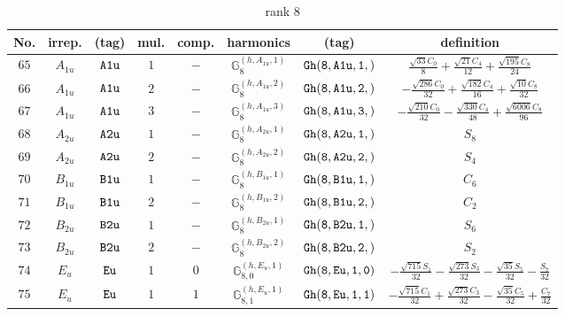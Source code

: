 \documentclass[fleqn,8pt]{jsarticle}
\begin{document}
\begin{table}[ht!]
\begin{center}
\caption{rank 8}
\renewcommand{\arraystretch}{1.3}
\begin{tabular}{cccccccc} \hline \hline
No. & irrep. & (tag) & mul. & comp. & harmonics & (tag) & definition \\ \hline
$ 65 $ & $ A_{1u} $ & $ {\tt A1u} $ & $ 1 $ & $ - $ & $ \mathbb{G}_{8}^{(h,A_{1u},1)} $ & $ {\tt Gh(8,A1u,1,)} $ & $ \frac{\sqrt{33} C_{0}}{8} + \frac{\sqrt{21} C_{4}}{12} + \frac{\sqrt{195} C_{8}}{24} $ \\
$ 66 $ & $ A_{1u} $ & $ {\tt A1u} $ & $ 2 $ & $ - $ & $ \mathbb{G}_{8}^{(h,A_{1u},2)} $ & $ {\tt Gh(8,A1u,2,)} $ & $ - \frac{\sqrt{286} C_{0}}{32} + \frac{\sqrt{182} C_{4}}{16} + \frac{\sqrt{10} C_{8}}{32} $ \\
$ 67 $ & $ A_{1u} $ & $ {\tt A1u} $ & $ 3 $ & $ - $ & $ \mathbb{G}_{8}^{(h,A_{1u},3)} $ & $ {\tt Gh(8,A1u,3,)} $ & $ - \frac{\sqrt{210} C_{0}}{32} - \frac{\sqrt{330} C_{4}}{48} + \frac{\sqrt{6006} C_{8}}{96} $ \\
$ 68 $ & $ A_{2u} $ & $ {\tt A2u} $ & $ 1 $ & $ - $ & $ \mathbb{G}_{8}^{(h,A_{2u},1)} $ & $ {\tt Gh(8,A2u,1,)} $ & $ S_{8} $ \\
$ 69 $ & $ A_{2u} $ & $ {\tt A2u} $ & $ 2 $ & $ - $ & $ \mathbb{G}_{8}^{(h,A_{2u},2)} $ & $ {\tt Gh(8,A2u,2,)} $ & $ S_{4} $ \\
$ 70 $ & $ B_{1u} $ & $ {\tt B1u} $ & $ 1 $ & $ - $ & $ \mathbb{G}_{8}^{(h,B_{1u},1)} $ & $ {\tt Gh(8,B1u,1,)} $ & $ C_{6} $ \\
$ 71 $ & $ B_{1u} $ & $ {\tt B1u} $ & $ 2 $ & $ - $ & $ \mathbb{G}_{8}^{(h,B_{1u},2)} $ & $ {\tt Gh(8,B1u,2,)} $ & $ C_{2} $ \\
$ 72 $ & $ B_{2u} $ & $ {\tt B2u} $ & $ 1 $ & $ - $ & $ \mathbb{G}_{8}^{(h,B_{2u},1)} $ & $ {\tt Gh(8,B2u,1,)} $ & $ S_{6} $ \\
$ 73 $ & $ B_{2u} $ & $ {\tt B2u} $ & $ 2 $ & $ - $ & $ \mathbb{G}_{8}^{(h,B_{2u},2)} $ & $ {\tt Gh(8,B2u,2,)} $ & $ S_{2} $ \\
$ 74 $ & $ E_{u} $ & $ {\tt Eu} $ & $ 1 $ & $ 0 $ & $ \mathbb{G}_{8,0}^{(h,E_{u},1)} $ & $ {\tt Gh(8,Eu,1,0)} $ & $ - \frac{\sqrt{715} S_{1}}{32} - \frac{\sqrt{273} S_{3}}{32} - \frac{\sqrt{35} S_{5}}{32} - \frac{S_{7}}{32} $ \\
$ 75 $ & $ E_{u} $ & $ {\tt Eu} $ & $ 1 $ & $ 1 $ & $ \mathbb{G}_{8,1}^{(h,E_{u},1)} $ & $ {\tt Gh(8,Eu,1,1)} $ & $ - \frac{\sqrt{715} C_{1}}{32} + \frac{\sqrt{273} C_{3}}{32} - \frac{\sqrt{35} C_{5}}{32} + \frac{C_{7}}{32} $ \\

\end{tabular}
\end{center}
\end{table}
\end{document}
